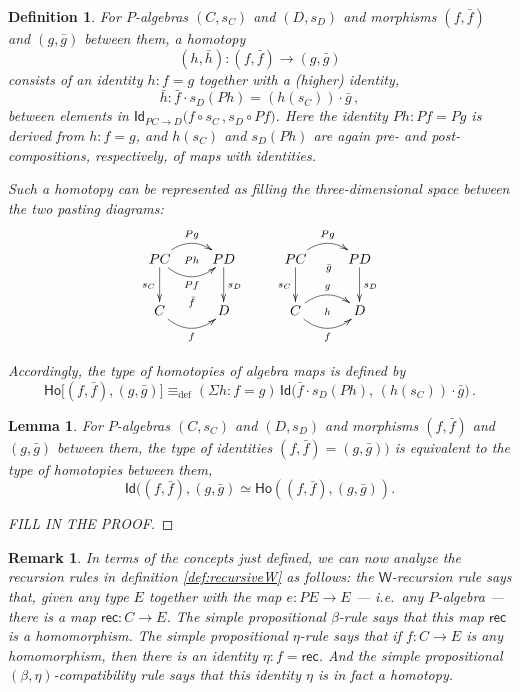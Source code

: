 \documentclass[reqno,10pt,a4paper,oneside]{amsart}
\numberwithin{equation}{section}
\theoremstyle{mythm}
\newtheorem{lemma}[theorem]{Lemma}
\theoremstyle{mydef}
\newtheorem{definition}[theorem]{Definition}
\theoremstyle{myrmk}
\newtheorem{remark}[theorem]{Remark}
\newcommand{\deq}{\equiv}
\newcommand{\defeq}{\deq_{\mathrm{def}}}
\newcommand{\Id}{\mathsf{Id}}
\newcommand{\id}[1]{\Id_{#1}}
\newcommand{\W}{\mathsf{W}}
\newcommand{\rec}{\mathsf{rec}}
\newcommand{\Ho}{\mathsf{Ho}}
\begin{document}
\begin{definition}
For $P$-algebras $(C,s_C)$ and $(D,s_D)$ and morphisms $(f, \bar{f})$ and $(g, \bar{g})$ between them, a \emph{homotopy}  $$(h, \bar{h}) : (f, \bar{f}) \rightarrow (g, \bar{g})$$
consists of an identity  $h : f = g$ together with a (higher) identity, 
\[
\bar{h} : \bar{f} \cdot s_D(Ph) = (h(s_C))\cdot \bar{g}\, ,
\]
between elements in $\id{PC \rightarrow D}\big( f \circ s_C \, ,  s_{D} \circ Pf \big)$.  Here the identity $Ph : Pf = Pg$ is derived from $h : f = g$, and $h(s_C)$ and $s_D(Ph)$ are again pre- and post-compositions, respectively, of maps with identities.

Such a homotopy can be represented as filling the three-dimensional space between the two pasting diagrams:
\[
\xymatrix{
PC \ar@/^1pc/[r]^{Pg}   \ar[d]_{s_C}   \ar@/_1pc/[r]_{Pf} \ar@{}[r]|{Ph}
& PD \ar[d]^{s_D}  \\
C  \ar@/_1pc/[r]_f  \ar@{}[r]^{\bar{f}} & D }
\qquad
\xymatrix{
PC \ar@/^1pc/[r]^{Pg}   \ar[d]_{s_C} \ar@{}[r]_(.52){\bar{g}}  & PD \ar[d]^{s_D}  \\
C \ar@/^1pc/[r]^g  \ar@/_1pc/[r]_f  \ar@{}[r]|{h} & D }
\]

Accordingly, the type of homotopies of algebra maps is defined by
\[
\Ho
\big[ (f,\bar{f}), (g, \bar{g})  \big]
 \defeq  
(\Sigma h:  f = g) \, \Id\big( \bar{f} \cdot s_D(Ph),\, (h(s_C))\cdot \bar{g} \big) \, .
\]
\end{definition}

\begin{lemma}\label{IdEqHo}
For $P$-algebras $(C,s_C)$ and $(D,s_D)$ and morphisms $(f, \bar{f})$ and $(g, \bar{g})$ between them, the type of identities $(f, \bar{f}) = (g, \bar{g}))$ is equivalent to the type of homotopies between them,
\[
\Id((f, \bar{f}), (g, \bar{g}) \simeq \Ho((f, \bar{f}), (g, \bar{g})).
\]
\end{lemma}

\begin{proof}
[FILL IN THE PROOF]
\end{proof}

\begin{remark}
In terms of the concepts just defined, we can now analyze the recursion rules in definition \ref{def:recursiveW} as follows: the $\W$-recursion rule says that, given any type $E$ together with the map $e : PE\to E$ --- i.e.\ any $P$-algebra --- there is a map $\rec : C\to E$.  The simple propositional $\beta$-rule says that this map $\rec$ is a homomorphism.  The simple propositional $\eta$-rule says that if $f : C\to E$ is any homomorphism, then there is an identity $\eta : f = \rec$.  And the simple propositional $(\beta, \eta)$-compatibility rule says that this identity $\eta$ is in fact a homotopy.
\end{remark}
\end{document}

